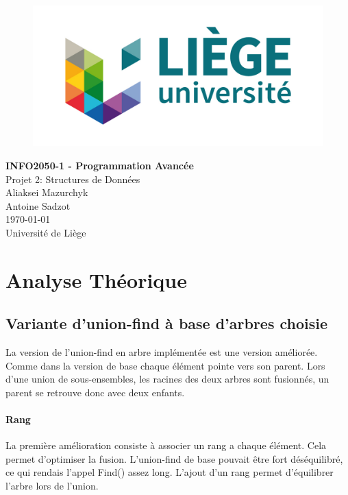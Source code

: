 \documentclass[11pt]{article}
\begin{document}
\begin{titlepage}

   \begin{figure}[htbp]
      \centering
      \includegraphics{uliege-logo-couleurs-300.jpg}
   \end{figure}
  	
  	\hfill

	\begin{center}
		\vfill
		\textbf{
		\Huge{INFO2050-1 - Programmation Avancée}}\\
		\bigskip
		\huge{Projet 2: Structures de Données}\\
		\bigskip %
		\smallskip
		\Large{Aliaksei Mazurchyk\\Antoine Sadzot}\\
		\bigskip
		\smallskip
		\large{\today}\\%
		\vfill
		\large{Université de Liège}
	\end{center}
\end{titlepage}
\clearpage
\clearpage

\section{Analyse Théorique}
\subsection{Variante d'union-find à base d'arbres choisie}
	La version de l'union-find en arbre implémentée est une version améliorée. Comme dans la version de base chaque élément pointe vers son parent. Lors d'une union de sous-ensembles, les racines des deux arbres sont fusionnés, un parent se retrouve donc avec deux enfants.
	
	\paragraph{Rang}			
	La première amélioration consiste à associer un rang a chaque élément. Cela permet d'optimiser la fusion. L'union-find de base pouvait être fort déséquilibré, ce qui rendais l'appel Find() assez long. L'ajout d'un rang permet d'équilibrer l'arbre lors de l'union. 
	
\end{document}
